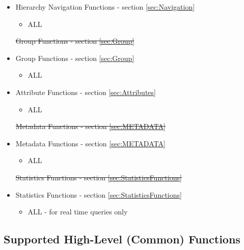 \documentclass[12pt]{report} %
\providecommand{\DIFdeltex}[1]{{\protect\color{red}\sout{#1}}}                      %
\providecommand{\DIFaddbegin}{} %
\providecommand{\DIFaddend}{} %
\providecommand{\DIFdelbegin}{} %
\providecommand{\DIFdelend}{} %
\providecommand{\DIFdel}[1]{\texorpdfstring{\DIFdeltex{#1}}{}} %
\newcommand{\DIFscaledelfig}{0.5}
\newlength{\DIFdelgraphicswidth} %
\newlength{\DIFdelgraphicsheight} %
\newcommand{\DIFaddincludegraphics}[2][]{{\color{blue}\fbox{\DIFOincludegraphics[#1]{#2}}}} %
\newcommand{\DIFdelincludegraphics}[2][]{%
\sbox{\DIFdelgraphicsbox}{\DIFOincludegraphics[#1]{#2}}%
\settoboxwidth{\DIFdelgraphicswidth}{\DIFdelgraphicsbox} %
\settoboxtotalheight{\DIFdelgraphicsheight}{\DIFdelgraphicsbox} %
\scalebox{\DIFscaledelfig}{%
\parbox[b]{\DIFdelgraphicswidth}{\usebox{\DIFdelgraphicsbox}\\[-\baselineskip] \rule{\DIFdelgraphicswidth}{0em}}\llap{\resizebox{\DIFdelgraphicswidth}{\DIFdelgraphicsheight}{%
\setlength{\unitlength}{\DIFdelgraphicswidth}%
\begin{picture}(1,1)%
\thicklines\linethickness{2pt} %
{\color[rgb]{1,0,0}\put(0,0){\framebox(1,1){}}}%
{\color[rgb]{1,0,0}\put(0,0){\line( 1,1){1}}}%
{\color[rgb]{1,0,0}\put(0,1){\line(1,-1){1}}}%
\end{picture}%
}\hspace*{3pt}}} %
} %
\DeclareRobustCommand{\DIFaddbegin}{\DIFOaddbegin \let\includegraphics\DIFaddincludegraphics} %
\DeclareRobustCommand{\DIFaddend}{\DIFOaddend \let\includegraphics\DIFOincludegraphics} %
\DeclareRobustCommand{\DIFdelbegin}{\DIFOdelbegin \let\includegraphics\DIFdelincludegraphics} %
\DeclareRobustCommand{\DIFdelend}{\DIFOaddend \let\includegraphics\DIFOincludegraphics} %
\begin{document}
\begin{itemize}[noitemsep,nolistsep] 
	\item{Hierarchy Navigation Functions - section \ref{sec:Navigation}}
		\begin{itemize}[noitemsep,nolistsep] 
			\item{ALL}
		\end{itemize}
	\DIFdelbegin %
\DIFdel{Group Functions - section \ref{sec:Group}
	}\DIFdelend \DIFaddbegin \item{Group Functions - section \ref{sec:Group}}
		\DIFaddend \begin{itemize}[noitemsep,nolistsep] 
			\item{ALL}
		\end{itemize}
	\item{Attribute Functions - section \ref{sec:Attributes}}
		\begin{itemize}[noitemsep,nolistsep] 
			\item{ALL}
		\end{itemize}
	\DIFdelbegin %
\DIFdel{Metadata Functions - section \ref{sec:METADATA}
	}\DIFdelend \DIFaddbegin \item{Metadata Functions - section \ref{sec:METADATA}}
		\DIFaddend \begin{itemize}[noitemsep,nolistsep] 
			\item{ALL}
		\end{itemize}
	\DIFdelbegin %
\DIFdel{Statistics Functions - section \ref{sec:StatisticsFunctions}
	}\DIFdelend \DIFaddbegin \item{Statistics Functions - section \ref{sec:StatisticsFunctions}}
		\DIFaddend \begin{itemize}[noitemsep,nolistsep] 
			\item{ALL - for real time queries only}
		\end{itemize}
\end{itemize}


\subsection{Supported High-Level (Common) Functions}\label{sec:AppOSHighLevel}

\DIFdelbegin %
\end{document}
